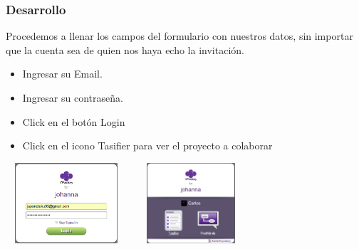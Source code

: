 \documentclass[8pt]{beamer}
\begin{document}
\begin{frame}
\frametitle{Desarrollo}
Procedemos a llenar los campos del formulario con nuestros datos, sin importar que la cuenta sea de quien nos haya echo la invitación.

\setlength{\parskip}{03pt}
\begin{center}
\begin{itemize}
\item{Ingresar su Email.}
\item{Ingresar su contraseña.}
\item{Click en el botón Login}
\item{Click en el icono Tasifier para ver el proyecto a colaborar}
\end{itemize} 

\setlength{\parskip}{08pt}
\includegraphics[width=4.5cm, height=3cm]{img/cap17} \hspace{0.5cm}
\includegraphics[width=4.5cm, height=3cm]{img/cap18}
\end{center}
\end{frame}
\end{document}
